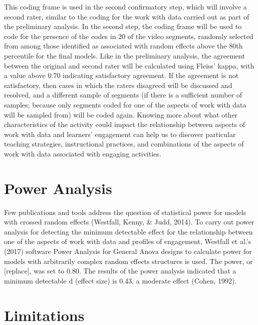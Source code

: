 \documentclass[]{book}
\theoremstyle{definition}
\theoremstyle{definition}
\theoremstyle{definition}
\theoremstyle{remark}
\begin{document}
This coding frame is used in the second confirmatory step, which will
involve a second rater, similar to the coding for the work with data
carried out as part of the preliminary analysis. In the second step, the
coding frame will be used to code for the presence of the codes in 20 of
the video segments, randomly selected from among those identified as
associated with random effects above the 80th percentile for the final
models. Like in the preliminary analysis, the agreement between the
original and second rater will be calculated using Fleiss' kappa, with a
value above 0.70 indicating satisfactory agreement. If the agreement is
not satisfactory, then cases in which the raters disagreed will be
discussed and resolved, and a different sample of segments (if there is
a sufficient number of samples; because only segments coded for one of
the aspects of work with data will be sampled from) will be coded again.
Knowing more about what other characteristics of the activity could
impact the relationship between aspects of work with data and learners'
engagement can help us to discover particular teaching strategies,
instructional practices, and combinations of the aspects of work with
data associated with engaging activities.

\section{Power Analysis}\label{power-analysis}

Few publications and tools address the question of statistical power for
models with crossed random effects (Westfall, Kenny, \& Judd, 2014). To
carry out power analysis for detecting the minimum detectable effect for
the relationship between one of the aspects of work with data and
profiles of engagement, Westfall et al.'s (2017) software Power Analysis
for General Anova designs to calculate power for models with arbitrarily
complex random effects structures is used. The power, or {[}replace{]},
was set to 0.80. The results of the power analysis indicated that a
minimum detectable d (effect size) is 0.43, a moderate effect (Cohen,
1992).

\section{Limitations}\label{limitations}
\end{document}
